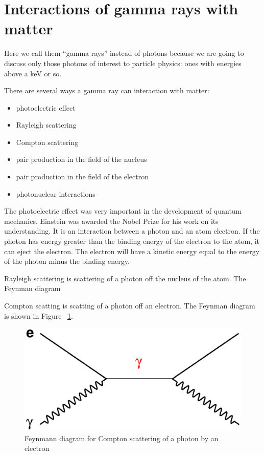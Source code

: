 \section{Interactions of gamma rays with matter}

Here we call them “gamma rays” instead of photons because we are going to discuss only those photons of interest to particle physics: ones with energies above a keV or so.

There are several ways a gamma ray can interaction with matter:
\begin{itemize}
\item photoelectric effect
\item Rayleigh scattering
\item Compton scattering
\item pair production in the field of the nucleus
\item pair production in the field of the electron
\item photonuclear interactions
\end{itemize}

The photoelectric effect was very important in the development of quantum mechanics.  Einstein was awarded the Nobel Prize for his work on its understanding.  It is an interaction between a photon and an atom electron.  If the photon has energy greater than the binding energy of the electron to the atom, it can eject the electron.  The electron will have a kinetic energy equal to the energy of the photon minus the binding energy.

Rayleigh scattering is scattering of a photon off the nucleus of the atom.  The Feynman diagram 

Compton scatting is scatting of a photon off an electron.  The Feynman diagram is shown in Figure ~\ref{fig:compton}. 


\begin{figure}[h]
\centering\includegraphics[scale=0.5]{./particleinteractions/Pictures/compton.eps}
\caption{Feynmann diagram for Compton scattering of a photon by an electron}
\label{fig:compton}
\end{figure}

